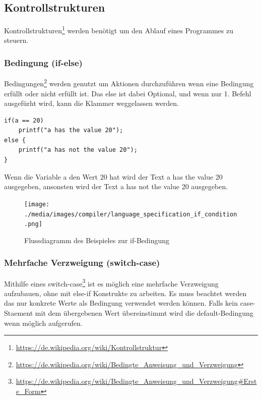 \newpage
\subsection{Kontrollstrukturen}

Kontrollstrukturen\footnote{\url{https://de.wikipedia.org/wiki/Kontrollstruktur} } werden ben\"otigt um den Ablauf eines Programmes zu steuern.

\subsubsection{Bedingung (if-else)}

Bedingungen\footnote{\url{https://de.wikipedia.org/wiki/Bedingte_Anweisung_und_Verzweigung}} werden genutzt um Aktionen durchzuf\"uhren wenn eine Bedingung erf\"ullt oder nicht erf\"ullt ist. Das else ist dabei Optional, und wenn nur 1. Befehl ausgef\"urht wird, kann die Klammer weggelassen werden.


\begin{lstlisting}[language=CMM]
if(a == 20)
	printf("a has the value 20");
else {
	printf("a has not the value 20");
}
\end{lstlisting}

Wenn die Variable a den Wert 20 hat wird der Text \glqq{}a has the value 20\grqq{} ausgegeben, ansonsten wird der Text \glqq{}a has not the value 20\grqq{} ausgegeben.

\begin{figure}[h]
\centering
\texttt{[image: ./media/images/compiler/language\_specification\_if\_condition.png]}
\caption{Flussdiagramm des Beispieles zur if-Bedingung}
\label{language_specification_if_condition}
\end{figure}

\newpage
\subsubsection{Mehrfache Verzweigung (switch-case)}

Mithilfe eines switch-case\footnote{\url{https://de.wikipedia.org/wiki/Bedingte_Anweisung_und_Verzweigung\#Erste_Form}} ist es m\"oglich eine mehrfache Verzweigung aufzubauen, ohne mit else-if Konstrukte zu arbeiten. Es muss beachtet werden das nur konkrete Werte als Bedingung verwendet werden k\"onnen. Falls kein case-Staement mit dem \"ubergebenen Wert \"ubereinstimmt wird die default-Bedingung wenn m\"oglich aufgerufen.

